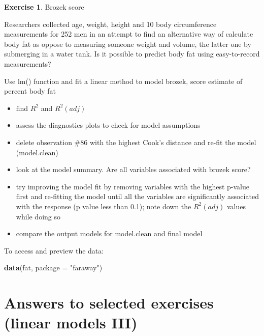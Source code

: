 \documentclass[
]{book}
\newenvironment{Shaded}{\begin{snugshade}}{\end{snugshade}}
\newcommand{\DataTypeTok}[1]{\textcolor[rgb]{0.13,0.29,0.53}{#1}}
\newcommand{\KeywordTok}[1]{\textcolor[rgb]{0.13,0.29,0.53}{\textbf{#1}}}
\newcommand{\NormalTok}[1]{#1}
\newcommand{\StringTok}[1]{\textcolor[rgb]{0.31,0.60,0.02}{#1}}
\providecommand{\tightlist}{%
  \setlength{\itemsep}{0pt}\setlength{\parskip}{0pt}}
\theoremstyle{definition}
\theoremstyle{definition}
\theoremstyle{definition}
\newtheorem{exercise}{Exercise}[chapter]
\theoremstyle{remark}
\begin{document}
\begin{exercise}
\protect\hypertarget{exr:lm-brozek}{}{\label{exr:lm-brozek} }
Brozek score

Researchers collected age, weight, height and 10 body circumference measurements for 252 men in an attempt to find an alternative way of calculate body fat as oppose to measuring someone weight and volume, the latter one by submerging in a water tank. Is it possible to predict body fat using easy-to-record measurements?

Use lm() function and fit a linear method to model brozek, score estimate of percent body fat

\begin{itemize}
\tightlist
\item
  find \(R^2\) and \(R^2(adj)\)
\item
  assess the diagnostics plots to check for model assumptions
\item
  delete observation \#86 with the highest Cook's distance and re-fit the model (model.clean)
\item
  look at the model summary. Are all variables associated with brozek score?
\item
  try improving the model fit by removing variables with the highest p-value first and re-fitting the model until all the variables are significantly associated with the response (p value less than 0.1); note down the \(R^2(adj)\) values while doing so
\item
  compare the output models for model.clean and final model
\end{itemize}
\end{exercise}

To access and preview the data:

\begin{Shaded}
\begin{Highlighting}[]
\KeywordTok{data}\NormalTok{(fat, }\DataTypeTok{package =} \StringTok{"faraway"}\NormalTok{)}
\end{Highlighting}
\end{Shaded}

\hypertarget{answers-to-selected-exercises-linear-models-iii}{%
\section*{Answers to selected exercises (linear models III)}\label{answers-to-selected-exercises-linear-models-iii}}
\end{document}
